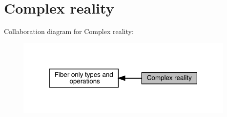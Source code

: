 \hypertarget{group__rcomplex}{}\section{Complex reality}
\label{group__rcomplex}
Collaboration diagram for Complex reality\+:\nopagebreak
\begin{figure}[H]
\begin{center}
\leavevmode
\includegraphics[width=307pt]{da/dc7/group__rcomplex}
\end{center}
\end{figure}
